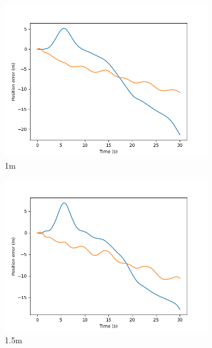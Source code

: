 \documentclass[class=article, crop=false]{standalone}
\begin{document}
\begin{figure}
\begin{subfigure}[b]{0.48\textwidth}
        \includegraphics{scenario1/rov-100m/1.0m/rov_position_error_uncontrolled}
        \caption{1m}
        \label{}
    \end{subfigure}
    \hfill
    \begin{subfigure}[b]{0.48\textwidth}
        \centering
        \includegraphics{scenario1/rov-100m/1.5m/rov_position_error_uncontrolled}
        \caption{1.5m}
        \label{}
    \end{subfigure}
    \vfill
    \begin{subfigure}[b]{0.48\textwidth}
        \centering

\end{subfigure}
\end{figure}
\end{document}
